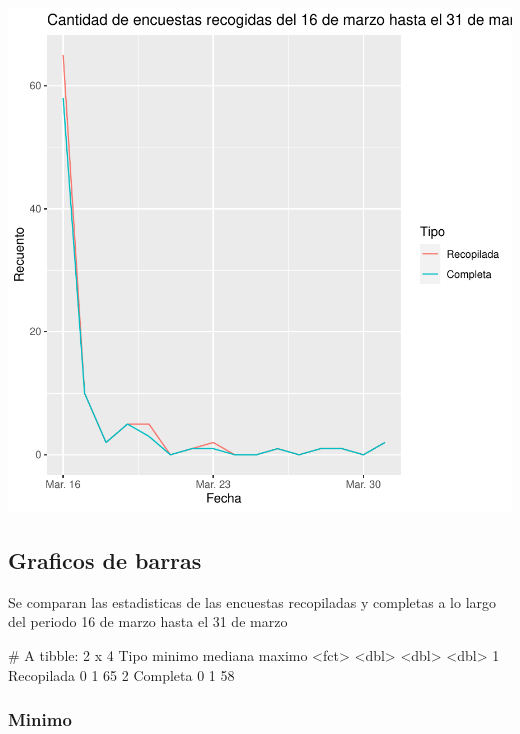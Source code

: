 \documentclass{article}
\begin{document}
\includegraphics{seguimento2-055}

\subsection{Graficos de barras}
Se comparan las estadisticas de las encuestas recopiladas y completas a lo largo del periodo 16 de marzo hasta el 31 de marzo

\begin{Schunk}
\begin{Soutput}
# A tibble: 2 x 4
  Tipo       minimo mediana maximo
  <fct>       <dbl>   <dbl>  <dbl>
1 Recopilada      0       1     65
2 Completa        0       1     58
\end{Soutput}
\end{Schunk}

\subsubsection{Minimo}
\end{document}

